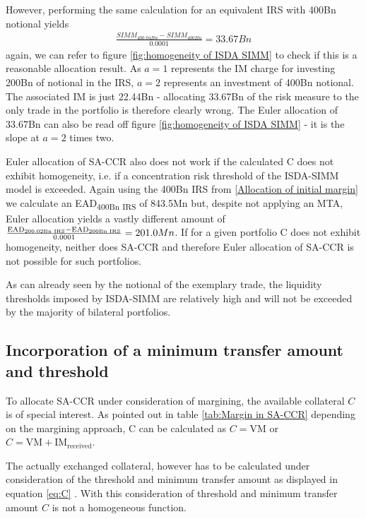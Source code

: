 \documentclass[../Thesis_AHoecherl.tex]{subfiles}
\begin{document}
    However, performing the same calculation for an equivalent IRS with 400Bn notional yields
    \begin{align*}
        \frac{SIMM_{400.04Bn} - SIMM_{400Bn}}{0.0001} = 33.67Bn
    \end{align*}
    again, we can refer to figure \ref{fig:homogeneity of ISDA SIMM} to check if this is a reasonable allocation result. As $a=1$ represents the IM charge for investing 200Bn of notional in the IRS, $a=2$ represents an investment of 400Bn notional. The associated IM is just 22.44Bn - allocating 33.67Bn of the risk measure to the only trade in the portfolio is therefore clearly wrong. The Euler allocation of 33.67Bn can also be read off figure \ref{fig:homogeneity of ISDA SIMM} - it is the slope at $a=2$ times two.

    Euler allocation of SA-CCR also does not work if the calculated C does not exhibit homogeneity, i.e. if a concentration risk threshold of the ISDA-SIMM model is exceeded. Again using the 400Bn IRS from \ref{Allocation of initial margin} we calculate an EAD\textsubscript{400Bn IRS} of 843.5Mn but, despite not applying an MTA, Euler allocation yields a vastly different amount of $ \frac{\text{EAD\textsubscript{200.02Bn IRS}}-\text{EAD\textsubscript{200Bn IRS}}}{0.0001} = 201.0Mn $. If for a given portfolio C does not exhibit homogeneity, neither does SA-CCR and therefore Euler allocation of SA-CCR is not possible for such portfolios. 

    As can already seen by the notional of the exemplary trade, the liquidity thresholds imposed by ISDA-SIMM are relatively high and will not be exceeded by the majority of bilateral portfolios.


    \subsection{Incorporation of a minimum transfer amount and threshold}

    To allocate \gls{SA-CCR} under consideration of margining, the available collateral $C$ is of special interest. As pointed out in table \ref{tab:Margin in SA-CCR} depending on the margining approach, C can be calculated as $C = \text{VM}$ or $C = \text{VM} + \text{IM}_{\text{received}}$.

    The actually exchanged collateral, however has to be calculated under consideration of the threshold and minimum transfer amount as displayed in equation \ref{eq:C} . With this consideration of threshold and minimum transfer amount $C$ is not a homogeneous function. 
\end{document}
